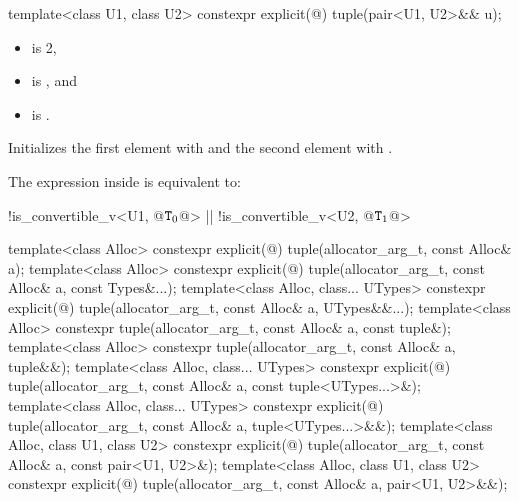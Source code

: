 %
%
\begin{itemdecl}
template<class U1, class U2> constexpr explicit(@\seebelow@) tuple(pair<U1, U2>&& u);
\end{itemdecl}

\begin{itemdescr}
\pnum
\constraints
\begin{itemize}
\item {} is 2,
\item {} is , and
\item {} is .
\end{itemize}

\pnum
\effects
Initializes the first element with
 and the
second element with .

\pnum
\remarks
The expression inside  is equivalent to:
\begin{codeblock}
!is_convertible_v<U1, @$\texttt{T}_0$@> || !is_convertible_v<U2, @$\texttt{T}_1$@>
\end{codeblock}
\end{itemdescr}

%
\begin{itemdecl}
template<class Alloc>
  constexpr explicit(@\seebelow@)
    tuple(allocator_arg_t, const Alloc& a);
template<class Alloc>
  constexpr explicit(@\seebelow@)
    tuple(allocator_arg_t, const Alloc& a, const Types&...);
template<class Alloc, class... UTypes>
  constexpr explicit(@\seebelow@)
    tuple(allocator_arg_t, const Alloc& a, UTypes&&...);
template<class Alloc>
  constexpr tuple(allocator_arg_t, const Alloc& a, const tuple&);
template<class Alloc>
  constexpr tuple(allocator_arg_t, const Alloc& a, tuple&&);
template<class Alloc, class... UTypes>
  constexpr explicit(@\seebelow@)
    tuple(allocator_arg_t, const Alloc& a, const tuple<UTypes...>&);
template<class Alloc, class... UTypes>
  constexpr explicit(@\seebelow@)
    tuple(allocator_arg_t, const Alloc& a, tuple<UTypes...>&&);
template<class Alloc, class U1, class U2>
  constexpr explicit(@\seebelow@)
    tuple(allocator_arg_t, const Alloc& a, const pair<U1, U2>&);
template<class Alloc, class U1, class U2>
  constexpr explicit(@\seebelow@)
    tuple(allocator_arg_t, const Alloc& a, pair<U1, U2>&&);
\end{itemdecl}

